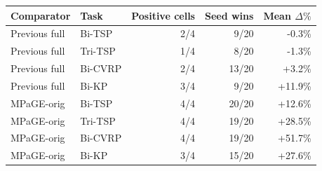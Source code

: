 \begin{tabular}{llrrr}
\toprule
Comparator & Task & Positive cells & Seed wins & Mean $\Delta\%$ \\
\midrule
Previous full & Bi-TSP & 2/4 & 9/20 & -0.3\% \\
Previous full & Tri-TSP & 1/4 & 8/20 & -1.3\% \\
Previous full & Bi-CVRP & 2/4 & 13/20 & +3.2\% \\
Previous full & Bi-KP & 3/4 & 9/20 & +11.9\% \\
MPaGE-orig & Bi-TSP & 4/4 & 20/20 & +12.6\% \\
MPaGE-orig & Tri-TSP & 4/4 & 19/20 & +28.5\% \\
MPaGE-orig & Bi-CVRP & 4/4 & 19/20 & +51.7\% \\
MPaGE-orig & Bi-KP & 3/4 & 15/20 & +27.6\% \\
\bottomrule
\end{tabular}
